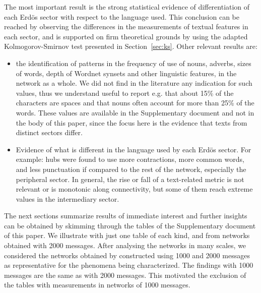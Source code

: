 \documentclass[review]{elsarticle}
\begin{document}
The most important result is the strong statistical evidence of differentiation of each Erd\"os sector with respect to the language used.
This conclusion can be reached by observing the differences in the measurements of textual features in
each sector, and is supported on firm theoretical grounds by using the adapted Kolmogorov-Smirnov test presented in Section~\ref{sec:ks}.
Other relevant results are:
\begin{itemize}
\item the identification of patterns in the frequency of use of nouns, adverbs, sizes of words, depth of Wordnet synsets and other linguistic features, in the network as a whole.
  We did not find in the literature any indication for such values, thus we understand useful to report e.g. that about 15\% of the characters are spaces and that nouns often account for more than 25\% of the words.
These values are available in the Supplementary document and not in the body of this paper,
since the focus here is the evidence that texts from distinct sectors differ.
\item Evidence of what is different in the language used by each Erd\"os sector. For example: hubs were found to use more contractions,
more common words, and less punctuation if compared to the rest of the network,
especially the peripheral sector.
In general, the rise or fall of a text-related metric is not relevant or is monotonic along connectivity,
but some of them reach extreme values in the intermediary sector.
\end{itemize}

The next sections summarize results of immediate interest
and further insights can be obtained by skimming through
the tables of the Supplementary document of this paper.
We illustrate with just one table of each kind,
and from networks obtained with 2000 messages.
After analysing the networks in many scales,
we considered the networks obtained by constructed using 1000 and 2000 messages as representative for the phenomena being characterized.
The findings with 1000 messages are the same as with 2000 messages.
This motivated the exclusion of the tables with measurements in
networks of 1000 messages.
\end{document}
